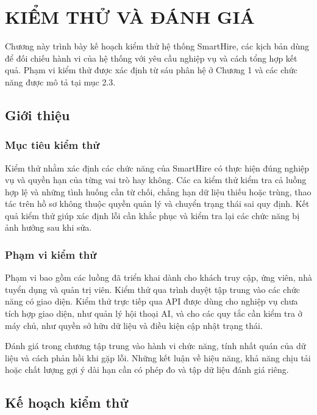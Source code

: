 
\newpage

\section{KIỂM THỬ VÀ ĐÁNH GIÁ}

Chương này trình bày kế hoạch kiểm thử hệ thống SmartHire, các kịch bản dùng để đối chiếu hành vi của hệ thống với yêu cầu nghiệp vụ và cách tổng hợp kết quả. Phạm vi kiểm thử được xác định từ sáu phân hệ ở Chương 1 và các chức năng được mô tả tại mục 2.3.

\subsection{Giới thiệu}

\subsubsection{Mục tiêu kiểm thử}

Kiểm thử nhằm xác định các chức năng của SmartHire có thực hiện đúng nghiệp vụ và quyền hạn của từng vai trò hay không. Các ca kiểm thử kiểm tra cả luồng hợp lệ và những tình huống cần từ chối, chẳng hạn dữ liệu thiếu hoặc trùng, thao tác trên hồ sơ không thuộc quyền quản lý và chuyển trạng thái sai quy định. Kết quả kiểm thử giúp xác định lỗi cần khắc phục và kiểm tra lại các chức năng bị ảnh hưởng sau khi sửa.

\subsubsection{Phạm vi kiểm thử}

Phạm vi bao gồm các luồng đã triển khai dành cho khách truy cập, ứng viên, nhà tuyển dụng và quản trị viên. Kiểm thử qua trình duyệt tập trung vào các chức năng có giao diện. Kiểm thử trực tiếp qua API được dùng cho nghiệp vụ chưa tích hợp giao diện, như quản lý hội thoại AI, và cho các quy tắc cần kiểm tra ở máy chủ, như quyền sở hữu dữ liệu và điều kiện cập nhật trạng thái.

Đánh giá trong chương tập trung vào hành vi chức năng, tính nhất quán của dữ liệu và cách phản hồi khi gặp lỗi. Những kết luận về hiệu năng, khả năng chịu tải hoặc chất lượng gợi ý dài hạn cần có phép đo và tập dữ liệu đánh giá riêng.

\subsection{Kế hoạch kiểm thử}

